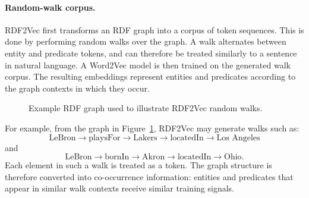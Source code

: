 \documentclass[a4paper,oneside,bibliography=totoc]{scrbook}
\begin{document}
\paragraph{Random-walk corpus.}
RDF2Vec first transforms an RDF graph into a corpus of token sequences. This is
done by performing random walks over the graph. A walk alternates between entity
and predicate tokens, and can therefore be treated similarly to a sentence in
natural language. A Word2Vec model is then trained on the generated walk corpus.
The resulting embeddings represent entities and predicates according to the graph
contexts in which they occur.

\begin{figure}[htbp]
\centering
{}
\caption{Example RDF graph used to illustrate RDF2Vec random walks.}
\label{fig:rdf2vec_example}
\end{figure}

For example, from the graph in Figure~\ref{fig:rdf2vec_example}, RDF2Vec
may generate walks such as:
\[
\text{LeBron} \rightarrow \text{playsFor} \rightarrow \text{Lakers}
\rightarrow \text{locatedIn} \rightarrow \text{Los Angeles}
\]
and
\[
\text{LeBron} \rightarrow \text{bornIn} \rightarrow \text{Akron}
\rightarrow \text{locatedIn} \rightarrow \text{Ohio}.
\]
Each element in such a walk is treated as a token. The graph structure is
therefore converted into co-occurrence information: entities and predicates that
appear in similar walk contexts receive similar training signals.
\end{document}

